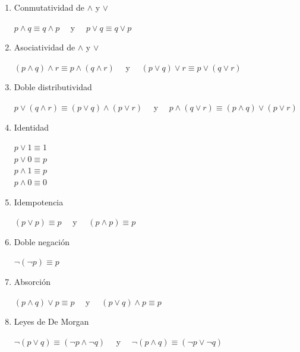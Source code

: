 \begin{enumerate}
	\item Conmutatividad de $\wedge$ y $\lor$
	\begin{center}
		$ p \wedge q \equiv q \wedge p \quad$ y $\quad p \lor q \equiv q \lor p $
	\end{center}
	
	\item Asociatividad de $\wedge$ y $\lor$
	\begin{center}
		$ (p \wedge q) \wedge r \equiv p \wedge (q \wedge r) \quad$ y 
		$\quad (p \lor q) \lor r \equiv p \lor (q \lor r) $
	\end{center}
	
	\item Doble distributividad
	\begin{center}
		$ p \lor (q \wedge r) \equiv (p \lor q) \wedge (p \lor r) \quad$ y 
		$\quad p \wedge (q \lor r) \equiv (p \wedge q) \lor (p \lor r)$ 
	\end{center}
	
	\item Identidad
	\begin{center}
		$ p \lor 1 \equiv 1 $\\
		$ p \lor 0 \equiv p $\\
		$ p \wedge 1 \equiv p $\\
		$ p \wedge 0 \equiv 0 $
	\end{center}
	
	\item Idempotencia
	\begin{center}
		$ (p \lor p) \equiv p \quad$ y $\quad (p \wedge p) \equiv p $
	\end{center}
	
	\item Doble negación
	\begin{center}
		$ \lnot (\lnot p) \equiv p $
	\end{center}
	
	\item Absorción
	\begin{center}
		$ (p \wedge q) \lor p \equiv p \quad$ y 
		$\quad (p \lor q) \wedge p \equiv p $
	\end{center}
	
	\item Leyes de De Morgan
	\begin{center}
		$ \lnot (p \lor q) \equiv (\lnot p \wedge \lnot q) \quad$ y 
		$\quad \lnot (p \wedge q) \equiv (\lnot p \lor \lnot q) $
	\end{center}
\end{enumerate}

